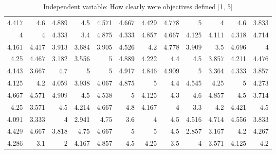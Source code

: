\documentclass[10pt]{report}
\begin{document}
\begin{table}[!htpb]
\begin{tabular}{rrrrrrrrrrrr}
	4.417 & 4.6   & 4.889 & 4.5   & 4.571 & 4.667 & 4.429 & 4.778 & 5     & 4     & 4.6   & 3.833 \\
	4     & 4     & 4.333 & 3.4   & 4.875 & 4.333 & 4.857 & 4.667 & 4.125 & 4.111 & 4.318 & 4.714 \\
	4.161 & 4.417 & 3.913 & 3.684 & 3.905 & 4.526 & 4.2   & 4.778 & 3.909 & 3.5   & 4.696 & 4     \\
	4.25  & 4.467 & 3.182 & 3.556 & 5     & 4.889 & 4.222 & 4.4   & 4.5   & 3.857 & 4.211 & 4.476 \\
	4.143 & 3.667 & 4.7   & 5     & 5     & 4.917 & 4.846 & 4.909 & 5     & 3.364 & 4.333 & 3.857 \\
	4.125 & 4.2   & 4.059 & 3.938 & 4.067 & 4.875 & 5     & 4.4   & 4.545 & 4.25  & 5     & 4.273 \\
	4.667 & 4.571 & 4.909 & 4.5   & 4.538 & 5     & 4.125 & 4.3   & 4.6   & 4.857 & 4.5   & 3.714 \\
	4.25  & 3.571 & 4.5   & 4.214 & 4.667 & 4.8   & 4.167 & 4     & 3.3   & 4.2   & 4.421 & 4.5   \\
	4.091 & 3.333 & 4     & 2.941 & 4.75  & 3.6   & 4     & 4.5   & 4.516 & 4.714 & 4.556 & 3.833 \\
	4.429 & 4.667 & 3.818 & 4.75  & 4.667 & 5     & 5     & 4.5   & 2.857 & 3.167 & 4.2   & 4.267 \\
	4.286 & 3.1   & 2     & 4.167 & 4.857 & 4.5   & 4.25  & 3.5   & 4     & 3.571 & 4.125 & 4.2   \\
	\hline
	\end{tabular}

    \caption{Independent variable: How clearly were objectives defined [1, 5]}
\end{table}
\end{document}

